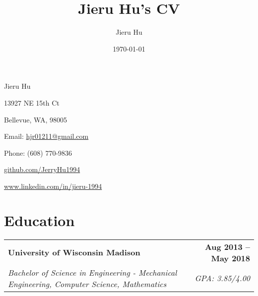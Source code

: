 \documentclass[a4paper,11pt]{article}
\makeatletter
\newcommand{\educationHeader}[4]{
  \vspace{-1pt}
    \begin{tabular*}{0.97\textwidth}{l@{\extracolsep{\fill}}r}
      \textbf{#1} & \textbf{#2} \\
      \textit{\small#3} & \textit{\small #4} \\
    \end{tabular*}\vspace{-5pt}
}
\newcommand{\courseWork}[3]{
  \vspace{-1pt}
    \begin{tabular*}{0.97\textwidth}{l@{\extracolsep{\fill}}r}
      \textit{\small #1}\\
    	  \textit{\small #2}\\
       \textit{\small #3}\\
    \end{tabular*}\vspace{-5pt}
}
\makeatother
\begin{document}
\title{Jieru Hu's CV}
\author{Jieru Hu}
\date{\today}

\begin{center}
{\Huge Jieru Hu}\par\bigskip
\begin{minipage}[b]{0.33333\textwidth}
\raggedright
13927 NE 15th Ct \par
Bellevue, WA, 98005
\end{minipage}%
\begin{minipage}[b]{0.33333\textwidth}
\centering
Email: \href{mailto:hjr01211@gmail.com}{hjr01211@gmail.com}\par
Phone: (608) 770-9836
\end{minipage}%
\begin{minipage}[b]{0.33333\textwidth}
\raggedleft
\href{github.com/JerryHu1994}{github.com/JerryHu1994}\par
\href{www.linkedin.com/in/jieru-1994}{www.linkedin.com/in/jieru-1994}
\end{minipage}
\end{center}


\section{Education}
	\educationHeader
	{University of Wisconsin Madison}{Aug 2013 – May 2018}
	{Bachelor of Science in Engineering - Mechanical Engineering, Computer Science, Mathematics}{GPA: 3.85/4.00}


\end{document}
